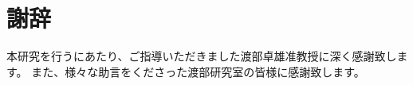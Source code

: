 \documentclass[12pt,dvipdfmx]{jreport}
\begin{document}
\maketitle
\tableofcontents










\chapter*{謝辞}
本研究を行うにあたり、ご指導いただきました渡部卓雄准教授に深く感謝致します。
また、様々な助言をくださった渡部研究室の皆様に感謝致します。




\appendix

\end{document}

